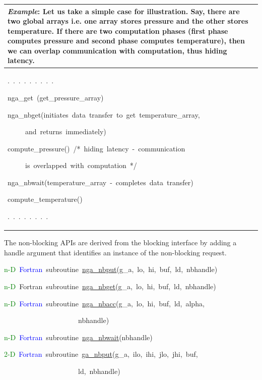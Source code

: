 \begin{tabular}{|>{\raggedright}p{13cm}|}
\hline 
\emph{Example}: Let us take a simple case for illustration. Say, there
are two global arrays i.e. one array stores pressure and the other
stores temperature. If there are two computation phases (first phase
computes pressure and second phase computes temperature), then we
can overlap communication with computation, thus hiding latency.\tabularnewline
\hline 
.~.~.~.~.~.~.~.~.~

nga\_get~(get\_pressure\_array)

nga\_nbget(initiates~data~transfer~to~get~temperature\_array,~

~~~~~and~returns~immediately)

compute\_pressure()~/{*}~hiding~latency~-~communication~

~~~~~is~overlapped~with~computation~{*}/

nga\_nbwait(temperature\_array~-~completes~data~transfer)

compute\_temperature()~

.~.~.~.~.~.~.~.
\tabularnewline
\hline
\end{tabular}

The non-blocking APIs are derived from the blocking interface by adding
a handle argument that identifies an instance of the non-blocking
request.

\textcolor{green}{n-D}~\textcolor{blue}{Fortran}~subroutine~\href{https://hpc.pnl.gov/globalarrays/api/f_op_api.html\#nga_nbput}{nga\_{}nbput}(g\_a,~lo,~hi,~buf,~ld,~nbhandle)~

\textcolor{green}{n-D}~Fortran~subroutine~\href{https://hpc.pnl.gov/globalarrays/api/f_op_api.html\#nga_nbget}{nga\_{}nbget}(g\_a,~lo,~hi,~buf,~ld,~nbhandle)~

\textcolor{green}{n-D}~\textcolor{blue}{Fortran}~subroutine~\href{https://hpc.pnl.gov/globalarrays/api/f_op_api.html\#nga_nbacc}{nga\_{}nbacc}(g\_a,~lo,~hi,~buf,~ld,~alpha,~

~~~~~~~~~~~~~~~~~~~~~nbhandle)~

\textcolor{green}{n-D}~\textcolor{blue}{Fortran}~subroutine~\href{https://hpc.pnl.gov/globalarrays/api/f_op_api.html\#nga_nbwait}{nga\_{}nbwait}(nbhandle)

\textcolor{green}{2-D}~\textcolor{blue}{Fortran}~subroutine~\href{https://hpc.pnl.gov/globalarrays/api/f_op_api.html\#ga_nbput}{ga\_{}nbput}(g\_a,~ilo,~ihi,~jlo,~jhi,~buf,

~~~~~~~~~~~~~~~~~~~~~ld,~nbhandle)~

